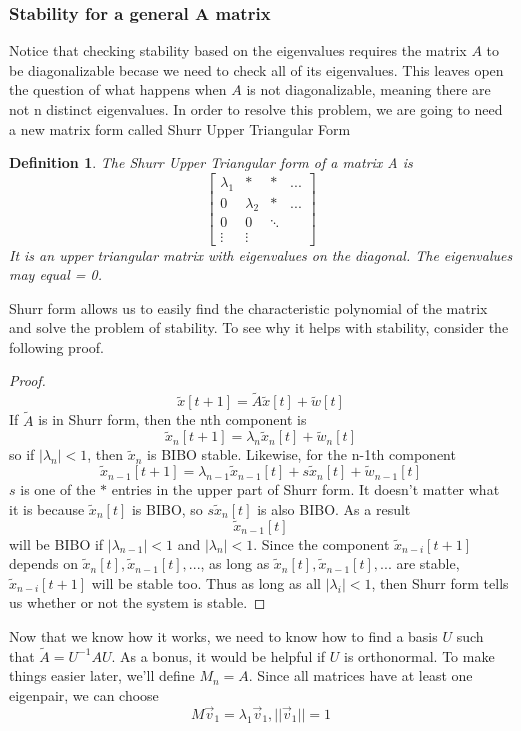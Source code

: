\documentclass{article}
\newtheorem{definition}{Definition}
\newtheorem{proof}{Proof}
\begin{document}
\subsubsection{Stability for a general A matrix}
Notice that checking stability based on the eigenvalues requires the matrix $A$ to be diagonalizable becase we need to check all of its eigenvalues.
This leaves open the question of what happens when $A$ is not diagonalizable, meaning there are not n distinct eigenvalues.
In order to resolve this problem, we are going to need a new matrix form called Shurr Upper Triangular Form
\begin{definition}
    The Shurr Upper Triangular form of a matrix A is
    \[
        \left[
            \begin{array}{cccc}
                \lambda_1 & * & * & ... \\
                0 & \lambda_2 & * & ... \\
                0 & 0 & \ddots & \\
                \vdots & \vdots &  & 
            \end{array}
        \right]
        \]
    It is an upper triangular matrix with eigenvalues on the diagonal. The eigenvalues may equal = 0.
\end{definition}
Shurr form allows us to easily find the characteristic polynomial of the matrix and solve the problem of stability.
To see why it helps with stability, consider the following proof.
\begin{proof}
    $$\tilde{x}[t+1]=\tilde{A}\tilde{x}[t]+\tilde{w}[t]$$
    If $\tilde{A}$ is in Shurr form, then the nth component is
    $$\tilde{x}_n[t+1]=\lambda_n\tilde{x}_n[t]+\tilde{w}_n[t]$$
    so if $|\lambda_n| < 1$, then $\tilde{x}_n$ is BIBO stable.
    Likewise, for the n-1th component
    $$\tilde{x}_{n-1}[t+1]=\lambda_{n-1}\tilde{x}_{n-1}[t]+s\tilde{x}_n[t]+\tilde{w}_{n-1}[t]$$
    $s$ is one of the $*$ entries in the upper part of Shurr form. It doesn't matter what it is because $\tilde{x}_n[t]$ is BIBO, so $s\tilde{x}_n[t]$ is also BIBO.
    As a result $$\tilde{x}_{n-1}[t]$$ will be BIBO if $|\lambda_{n-1}|<1$ and $|\lambda_n| < 1$.
    Since the component $\tilde{x}_{n-i}[t+1]$ depends on $\tilde{x}_n[t], \tilde{x}_{n-1}[t],...$, as long as $\tilde{x}_n[t], \tilde{x}_{n-1}[t],...$ are stable, $\tilde{x}_{n-i}[t+1]$ will be stable too.
    Thus as long as all $|\lambda_i|<1$, then Shurr form tells us whether or not the system is stable.
\end{proof}
Now that we know how it works, we need to know how to find a basis $U$ such that $\tilde{A}=U^{-1}AU$. As a bonus, it would be helpful if $U$ is orthonormal.
To make things easier later, we'll define $M_n = A$. Since all matrices have at least one eigenpair, we can choose
$$M\vec{v}_1=\lambda_1\vec{v}_1, ||\vec{v}_1||=1$$
\end{document}
